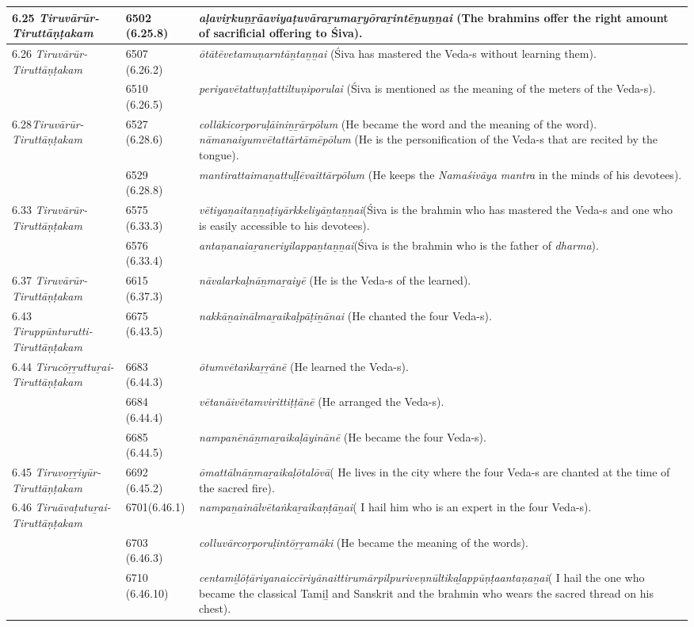 \begin{longtable}{|m{2.7cm}|m{2.7cm}|>{\raggedright}m{3.1cm}|}
\hline
6.25 \textit{Tiruvārūr- Tiruttāṇṭakam} & 6502 (6.25.8) & \textit{aḷaviṟkuṉṟāaviyaṭuvā\-raṟumaṟyōraṟintēṉu\-ṉṉai} (The brahmins offer the right amount of sacrificial offering to Śiva). \tabularnewline
\hline
6.26 \textit{Tiruvārūr- Tiruttāṇṭakam} & 6507 (6.26.2) & \textit{ōtātēvetamuṇarntāṉta\-ṉṉai} (Śiva\index{Siva@Śiva} has mastered the Veda-s without learning them). \tabularnewline
\hline
 & 6510 (6.26.5) & \textit{periyavētattuṇṭattiltu\-ṇiporulai} (Śiva is mentioned  as the meaning of the meters of the Veda-s). \tabularnewline
\hline
6.28\textit{Tiruvārūr- Tiruttāṇṭakam} & 6527 (6.28.6) & \textit{collākicoṟporuḷāiniṉṟār\-pōlum} (He became the word and the meaning of the word). \textit{nāmanaiyumvētattārtāmēpōlum} (He is the personification of the Veda-s that are recited by the tongue). \tabularnewline
\hline
 & 6529 (6.28.8) & \textit{mantirattaimaṉattuḷḷē\-vaittārpōlum} (He keeps the \textit{Namaśivāya mantra} in the minds of his devotees). \tabularnewline
\hline
6.33 \textit{Tiruvārūr- Tiruttāṇṭakam} & 6575 (6.33.3) & \textit{vētiyaṉaitaṉṉaṭiyār\-kkeliyāṉtaṉṉai}(Śiva is the brahmin who has mastered the Veda-s and one who is easily accessible to his devotees). \tabularnewline
\hline
 & 6576 (6.33.4) & \textit{antaṇanaiaṟaneriyila\-ppaṉtaṉṉai}(Śiva is the brahmin who is the father of \textit{dharma}). \tabularnewline
\hline
6.37 \textit{Tiruvārūr- Tiruttāṇṭakam} & 6615 (6.37.3) & \textit{nāvalarkaḷnāṉmaṟaiyē} (He is the Veda-s of the learned). \tabularnewline
\hline
6.43 \textit{Tiruppūnturutti- Tiruttāṇṭakam} & 6675 (6.43.5) & \textit{nakkāṉainālmaṟaikaḷ\-pāṭiṉānai} (He chanted the four Veda-s). \tabularnewline
\hline
6.44 \textit{Tirucōṟṟuttuṟai- Tiruttāṇṭakam} & 6683 (6.44.3) & \textit{ōtumvētaṅkaṟṟānē} (He learned the Veda-s). \tabularnewline
\hline
 & 6684 (6.44.4) & \textit{vētanāivētamvirittiṭṭānē} (He arranged the Veda-s). \tabularnewline
\hline
 & 6685 (6.44.5) & \textit{nampanēnāṉmaṟaika\-ḷāyinānē} (He became the four Veda-s). \tabularnewline
\hline
6.45 \textit{Tiruvoṟṟiyūr- Tiruttāṇṭakam} & 6692 (6.45.2) & \textit{ōmattālnāṉmaṟaikaḷō\-talōvā}( He lives in the city where the four Veda-s are chanted at the time of the sacred fire). \tabularnewline
\hline
6.46 \textit{Tiruāvaṭutuṟai- Tiruttāṇṭakam} & 6701(6.46.1) & \textit{nampaṉainālvētaṅ\-kaṟaikaṇṭāṉai}( I hail him who is an expert in the four Veda-s). \tabularnewline
\hline
 & 6703 (6.46.3) & \textit{colluvārcoṟporuḷintōṟṟa\-māki }(He became the meaning of the words). \tabularnewline
\hline
 & 6710 (6.46.10) & \textit{centamiḻōṭāriyanaiccīri\-yānaittirumārpilpuri\-veṇnūltikaḻappūṇṭaan\-taṇaṉai}( I hail the one who became the  classical Tamiḻ\index{Tamil@Tamiḻ} and Sanskrit\index{Sanskrit} and the brahmin who wears the sacred thread on his chest). \tabularnewline

\end{longtable}
